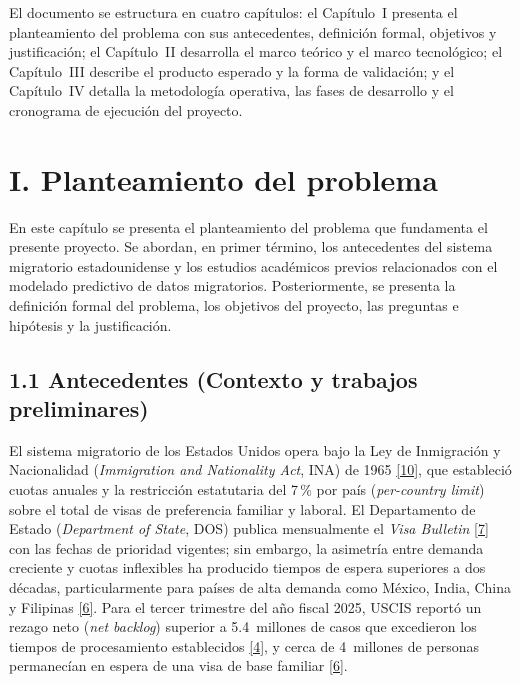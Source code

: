 \documentclass[12pt,letterpaper]{report}
\newcommand{\cita}[1]{\hyperref[bib:#1]{[#1]}}
\begin{document}
El documento se estructura en cuatro capítulos: el Capítulo~I presenta el planteamiento del problema con sus antecedentes, definición formal, objetivos y justificación; el Capítulo~II desarrolla el marco teórico y el marco tecnológico; el Capítulo~III describe el producto esperado y la forma de validación; y el Capítulo~IV detalla la metodología operativa, las fases de desarrollo y el cronograma de ejecución del proyecto.

\clearpage

\chapter{I. Planteamiento del problema}

En este capítulo se presenta el planteamiento del problema que fundamenta el presente proyecto. Se abordan, en primer término, los antecedentes del sistema migratorio estadounidense y los estudios académicos previos relacionados con el modelado predictivo de datos migratorios. Posteriormente, se presenta la definición formal del problema, los objetivos del proyecto, las preguntas e hipótesis y la justificación.

\section{1.1 Antecedentes (Contexto y trabajos preliminares)}

El sistema migratorio de los Estados Unidos opera bajo la Ley de Inmigración y Nacionalidad (\textit{Immigration and Nationality Act}, INA) de 1965 \cita{10}, que estableció cuotas anuales y la restricción estatutaria del 7\,\% por país (\textit{per-country limit}) sobre el total de visas de preferencia familiar y laboral. El Departamento de Estado (\textit{Department of State}, DOS) publica mensualmente el \textit{Visa Bulletin} \cita{7} con las fechas de prioridad vigentes; sin embargo, la asimetría entre demanda creciente y cuotas inflexibles ha producido tiempos de espera superiores a dos décadas, particularmente para países de alta demanda como México, India, China y Filipinas \cita{6}. Para el tercer trimestre del año fiscal 2025, USCIS reportó un rezago neto (\textit{net backlog}) superior a 5.4~millones de casos que excedieron los tiempos de procesamiento establecidos \cita{4}, y cerca de 4~millones de personas permanecían en espera de una visa de base familiar \cita{6}.
\end{document}

